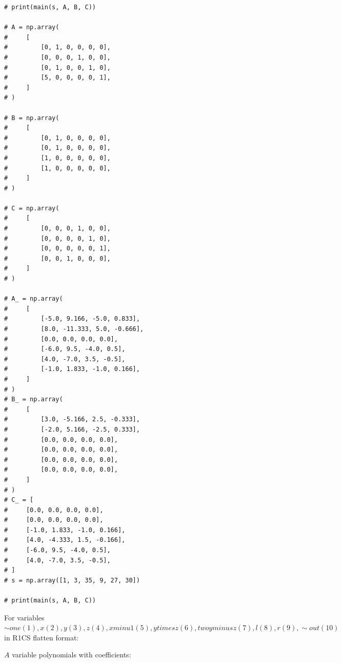 \documentclass[11pt]{article}
\begin{document}
\begin{verbatim}
# print(main(s, A, B, C))

# A = np.array(
#     [
#         [0, 1, 0, 0, 0, 0],
#         [0, 0, 0, 1, 0, 0],
#         [0, 1, 0, 0, 1, 0],
#         [5, 0, 0, 0, 0, 1],
#     ]
# )

# B = np.array(
#     [
#         [0, 1, 0, 0, 0, 0],
#         [0, 1, 0, 0, 0, 0],
#         [1, 0, 0, 0, 0, 0],
#         [1, 0, 0, 0, 0, 0],
#     ]
# )

# C = np.array(
#     [
#         [0, 0, 0, 1, 0, 0],
#         [0, 0, 0, 0, 1, 0],
#         [0, 0, 0, 0, 0, 1],
#         [0, 0, 1, 0, 0, 0],
#     ]
# )

# A_ = np.array(
#     [
#         [-5.0, 9.166, -5.0, 0.833],
#         [8.0, -11.333, 5.0, -0.666],
#         [0.0, 0.0, 0.0, 0.0],
#         [-6.0, 9.5, -4.0, 0.5],
#         [4.0, -7.0, 3.5, -0.5],
#         [-1.0, 1.833, -1.0, 0.166],
#     ]
# )
# B_ = np.array(
#     [
#         [3.0, -5.166, 2.5, -0.333],
#         [-2.0, 5.166, -2.5, 0.333],
#         [0.0, 0.0, 0.0, 0.0],
#         [0.0, 0.0, 0.0, 0.0],
#         [0.0, 0.0, 0.0, 0.0],
#         [0.0, 0.0, 0.0, 0.0],
#     ]
# )
# C_ = [
#     [0.0, 0.0, 0.0, 0.0],
#     [0.0, 0.0, 0.0, 0.0],
#     [-1.0, 1.833, -1.0, 0.166],
#     [4.0, -4.333, 1.5, -0.166],
#     [-6.0, 9.5, -4.0, 0.5],
#     [4.0, -7.0, 3.5, -0.5],
# ]
# s = np.array([1, 3, 35, 9, 27, 30])

# print(main(s, A, B, C))
\end{verbatim}

For variables \(\sim{one} (1),x (2),y (3),z (4),xminu1 (5),ytimesz (6),twoyminusz (7),l (8),r (9),\sim{out} (10)\) in R1CS flatten format:

\(A\) variable polynomials with coefficients:
\end{document}
